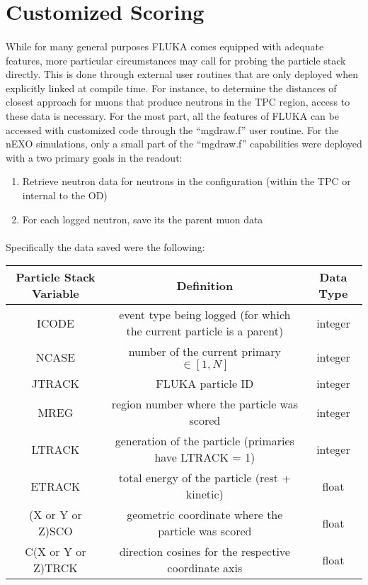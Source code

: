 \section{Customized Scoring}

\paragraph{}
While for many general purposes FLUKA comes equipped with adequate features, more particular circumstances may call for probing the particle stack directly. This is done through external user routines that are only deployed when explicitly linked at compile time. For instance, to determine the distances of closest approach for muons that produce neutrons in the TPC region, access to these data is necessary. For the most part, all the features of FLUKA can be accessed with customized code through the ``mgdraw.f'' user routine. For the nEXO simulations, only a small part of the ``mgdraw.f'' capabilities were deployed with a two primary goals in the readout:

\begin{enumerate}
    \item Retrieve neutron data for neutrons in the configuration (within the TPC or internal to the OD)
    \item For each logged neutron, save its the parent muon data
\end{enumerate}

\paragraph{}
Specifically the data saved were the following:

\footnotesize

\begin{center}
    \label{tab:mgdraw_vars}
\begin{tabular}[h]{|c|c|c|}
    \hline
    \textbf{Particle Stack Variable} & \textbf{Definition} & \textbf{Data Type}\\
    \hline
    \hline
    ICODE & event type being logged (for which the current particle is a parent) & integer \\
    NCASE & number of the current primary $\in [1,N]$ & integer\\
    JTRACK & FLUKA particle ID & integer \\
    MREG & region number where the particle was scored & integer \\
    LTRACK & generation of the particle (primaries have LTRACK = 1) & integer \\
    ETRACK & total energy of the particle (rest + kinetic) & float \\
    (X or Y or Z)SCO & geometric coordinate where the particle was scored & float \\
    C(X or Y or Z)TRCK & direction cosines for the respective coordinate axis & float \\
    \hline

\end{tabular}
\end{center}

